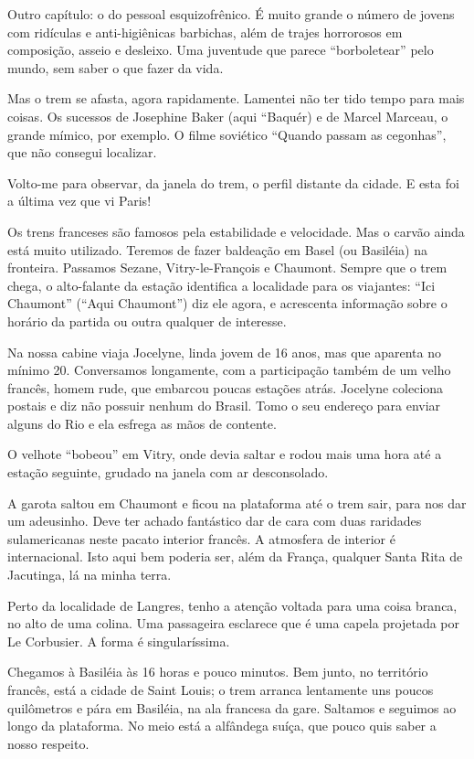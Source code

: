 Outro capítulo: o do pessoal esquizofrênico. É muito grande o número de jovens com ridículas e anti-higiênicas barbichas, além de trajes horrorosos em composição, asseio e desleixo. Uma juventude que parece ``borboletear'' pelo mundo, sem saber o que fazer da vida.

Mas o trem se afasta, agora rapidamente. Lamentei não ter tido tempo para mais coisas. Os sucessos de Josephine Baker (aqui ``Baquér) e de Marcel Marceau, o grande mímico, por exemplo. O filme soviético ``Quando passam as cegonhas'', que não consegui localizar.

Volto-me para observar, da janela do trem, o perfil distante da cidade. E esta foi a última vez que vi Paris!

Os trens franceses são famosos pela estabilidade e velocidade. Mas o carvão ainda está muito utilizado. Teremos de fazer baldeação em Basel (ou Basiléia) na fronteira. Passamos Sezane, Vitry-le-François e Chaumont. Sempre que o trem chega, o alto-falante da estação identifica a localidade para os viajantes: ``Ici Chaumont'' (``Aqui Chaumont'') diz ele agora, e acrescenta informação sobre o horário da partida ou outra qualquer de interesse.

Na nossa cabine viaja Jocelyne, linda jovem de 16 anos, mas que aparenta no mínimo 20. Conversamos longamente, com a participação também de um velho francês, homem rude, que embarcou poucas estações atrás. Jocelyne coleciona postais e diz não possuir nenhum do Brasil. Tomo o seu endereço para enviar alguns do Rio e ela esfrega as mãos de contente.

O velhote ``bobeou'' em Vitry, onde devia saltar e rodou mais uma hora até a estação seguinte, grudado na janela com ar desconsolado.

A garota saltou em Chaumont e ficou na plataforma até o trem sair, para nos dar um adeusinho. Deve ter achado fantástico dar de cara com duas raridades sulamericanas neste pacato interior francês. A atmosfera de interior é internacional. Isto aqui bem poderia ser, além da França, qualquer Santa Rita de Jacutinga, lá na minha terra.

Perto da localidade de Langres, tenho a atenção voltada para uma coisa branca, no alto de uma colina. Uma passageira esclarece que é uma capela projetada por Le Corbusier. A forma é singularíssima.

Chegamos à Basiléia às 16 horas e pouco minutos. Bem junto, no território francês, está a cidade de Saint Louis; o trem arranca lentamente uns poucos quilômetros e pára em Basiléia, na ala francesa da gare. Saltamos e seguimos ao longo da plataforma. No meio está a alfândega suíça, que pouco quis saber a nosso respeito.

